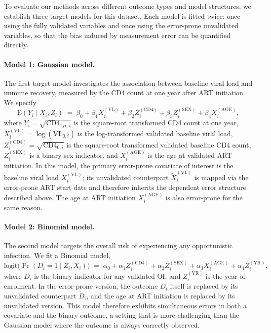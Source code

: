To evaluate our methods across different outcome types and model structures, we establish three target models for this dataset. Each model is fitted twice: once using the fully validated variables and once using the error-prone unvalidated variables, so that the bias induced by measurement error can be quantified directly.

\paragraph{Model 1: Gaussian model.}
The first target model investigates the association between baseline viral load and immune recovery, measured by the CD4 count at one year after ART initiation. We specify
\begin{equation}
    \mathrm{E}(Y_i \mid X_i, Z_i) \;=\;
    \beta_0
    + \beta_1 X_i^{(\mathrm{VL})}
    + \beta_2 Z_i^{(\mathrm{CD4})}
    + \beta_3 Z_i^{(\mathrm{SEX})}
    + \beta_4 X_i^{(\mathrm{AGE})},
    \label{eq:vccc_gauss}
\end{equation}
where $Y_i = \sqrt{\mathrm{CD4}_{1\mathrm{yr},i}}$ is the square-root transformed CD4 count at one year, $X_i^{(\mathrm{VL})} = \log(\mathrm{VL}_{0,i})$ is the log-transformed validated baseline viral load, $Z_i^{(\mathrm{CD4})} = \sqrt{\mathrm{CD4}_{0,i}}$ is the square-root transformed validated baseline CD4 count, $Z_i^{(\mathrm{SEX})}$ is a binary sex indicator, and $X_i^{(\mathrm{AGE})}$ is the age at validated ART initiation. In this model, the primary error-prone covariate of interest is the baseline viral load $X_i^{(\mathrm{VL})}$; its unvalidated counterpart $\tilde{X}_i^{(\mathrm{VL})}$ is mapped via the error-prone ART start date and therefore inherits the dependent error structure described above. The age at ART initiation $X_i^{(\mathrm{AGE})}$ is also error-prone for the same reason.

\paragraph{Model 2: Binomial model.}
The second model targets the overall risk of experiencing any opportunistic infection. We fit a Binomial model,
\begin{equation}
    \mathrm{logit}\bigl(\Pr(D_i = 1 \mid Z_i, X_i)\bigr) \;=\;
    \alpha_0
    + \alpha_1 Z_i^{(\mathrm{CD4})}
    + \alpha_2 Z_i^{(\mathrm{SEX})}
    + \alpha_3 X_i^{(\mathrm{AGE})}
    + \alpha_4 Z_i^{(\mathrm{YR})},
    \label{eq:vccc_binom}
\end{equation}
where $D_i$ is the binary indicator for any validated OI, and $Z_i^{(\mathrm{YR})}$ is the year of enrolment. In the error-prone version, the outcome $D_i$ itself is replaced by its unvalidated counterpart $\tilde{D}_i$, and the age at ART initiation is replaced by its unvalidated version. This model therefore exhibits simultaneous errors in both a covariate and the binary outcome, a setting that is more challenging than the Gaussian model where the outcome is always correctly observed.

